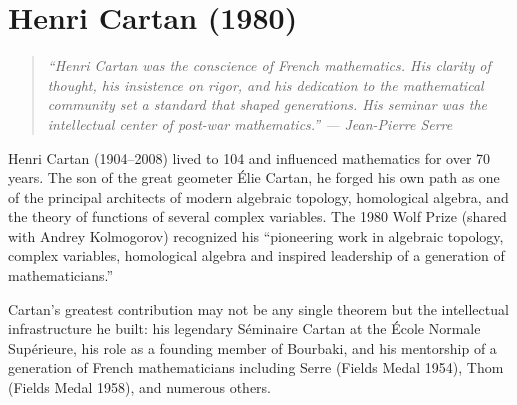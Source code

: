 \let\im\relax
\newcommand{\im}{\operatorname{im}}
\let\coker\relax
\newcommand{\coker}{\operatorname{coker}}
\let\Spec\relax
\newcommand{\Spec}{\operatorname{Spec}}
\let\Hom\relax
\newcommand{\Hom}{\operatorname{Hom}}
\let\Ext\relax
\newcommand{\Ext}{\operatorname{Ext}}
\let\Tor\relax
\newcommand{\Tor}{\operatorname{Tor}}
\let\Sh\relax
\newcommand{\Sh}{\operatorname{Sh}}
\let\sing\relax
\newcommand{\sing}{\operatorname{sing}}
\let\Ann\relax
\newcommand{\Ann}{\operatorname{Ann}}
\let\Supp\relax
\newcommand{\Supp}{\operatorname{Supp}}
\let\N\relax
\newcommand{\N}{\mathbb{N}}
\let\R\relax
\newcommand{\R}{\mathbb{R}}
\let\C\relax
\newcommand{\C}{\mathbb{C}}
\let\Q\relax
\newcommand{\Q}{\mathbb{Q}}
\let\Z\relax
\newcommand{\Z}{\mathbb{Z}}
\let\cF\relax
\newcommand{\cF}{\mathcal{F}}
\let\cG\relax
\newcommand{\cG}{\mathcal{G}}
\let\cU\relax
\newcommand{\cU}{\mathcal{U}}
\let\cV\relax
\newcommand{\cV}{\mathcal{V}}
\let\cA\relax
\newcommand{\cA}{\mathcal{A}}
\let\cB\relax
\newcommand{\cB}{\mathcal{B}}

\chapter{Henri Cartan (1980)}

\begin{quote}
\it ``Henri Cartan was the conscience of French mathematics. His clarity of thought, his insistence on rigor, and his dedication to the mathematical community set a standard that shaped generations. His seminar was the intellectual center of post-war mathematics.'' --- Jean-Pierre Serre
\end{quote}

Henri Cartan (1904--2008) lived to 104 and influenced mathematics for over 70 years. The son of the great geometer {\'E}lie Cartan, he forged his own path as one of the principal architects of modern algebraic topology, homological algebra, and the theory of functions of several complex variables. The 1980 Wolf Prize (shared with Andrey Kolmogorov) recognized his ``pioneering work in algebraic topology, complex variables, homological algebra and inspired leadership of a generation of mathematicians.''

Cartan's greatest contribution may not be any single theorem but the intellectual infrastructure he built: his legendary S{\'e}minaire Cartan at the {\'E}cole Normale Sup{\'e}rieure, his role as a founding member of Bourbaki, and his mentorship of a generation of French mathematicians including Serre (Fields Medal 1954), Thom (Fields Medal 1958), and numerous others.

